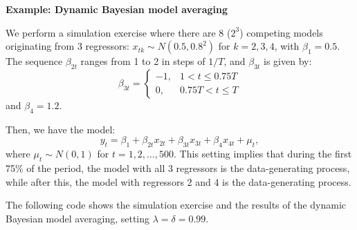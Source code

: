 \textbf{Example: Dynamic Bayesian model averaging}

We perform a simulation exercise where there are 8 ($2^3$) competing models originating from 3 regressors: $x_{tk} \sim N(0.5, 0.8^2)$ for $k = 2, 3, 4$, with $\beta_1 = 0.5$. The sequence $\beta_{2t}$ ranges from 1 to 2 in steps of $1/T$, and $\beta_{3t}$ is given by:
\[
\beta_{3t} = \begin{cases}
	-1, & 1 < t \leq 0.75T \\
	0, & 0.75T < t \leq T
\end{cases}
\]
and $\beta_4 = 1.2$. 

Then, we have the model:
\[
y_t = \beta_1 + \beta_{2t} x_{2t} + \beta_{3t} x_{3t} + \beta_4 x_{4t} + \mu_t, 
\]
where $\mu_t \sim N(0,1)$ for $t = 1, 2, \dots, 500$. This setting implies that during the first 75\% of the period, the model with all 3 regressors is the data-generating process, while after this, the model with regressors 2 and 4 is the data-generating process.

The following code shows the simulation exercise and the results of the dynamic Bayesian model averaging, setting $\lambda = \delta = 0.99$.

